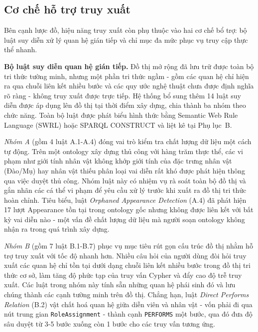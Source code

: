 
\subsection{Cơ chế hỗ trợ truy xuất}
\label{sec:retrieval_optimization}

Bên cạnh lược đồ, hiệu năng truy xuất còn phụ thuộc vào hai cơ chế bổ trợ: bộ luật suy diễn xử lý quan hệ gián tiếp và chỉ mục đa mức phục vụ truy cập thực thể nhanh.

\textbf{Bộ luật suy diễn quan hệ gián tiếp.}
Đồ thị mở rộng đã lưu trữ được toàn bộ tri thức tường minh, nhưng một phần tri thức ngầm - gồm các quan hệ chỉ hiện ra qua chuỗi liên kết nhiều bước và các quy ước nghệ thuật chưa được định nghĩa rõ ràng - không truy xuất được trực tiếp. Hệ thống bổ sung thêm 14 luật suy diễn được áp dụng lên đồ thị tại thời điểm xây dựng, chia thành ba nhóm theo chức năng. Toàn bộ luật được phát biểu hình thức bằng Semantic Web Rule Language (SWRL)  hoặc SPARQL CONSTRUCT và liệt kê tại Phụ lục~B.

\textit{Nhóm A} (gồm 4 luật A.1-A.4) đóng vai trò kiểm tra chất lượng dữ liệu một cách tự động. Trên một ontology xây dựng thủ công với hàng trăm thực thể, các vi phạm như giới tính nhân vật không khớp giới tính của đặc trưng nhân vật (Đào/Mụ) hay nhân vật thiếu phân loại vai diễn rất khó được phát hiện thông qua việc duyệt thủ công. Nhóm luật này có nhiệm vụ rà soát toàn bộ đồ thị và gắn nhãn các cá thể vi phạm để yêu cầu xử lý trước khi xuất ra đồ thị tri thức hoàn chỉnh. Tiêu biểu, luật \textit{Orphaned Appearance Detection} (A.4) đã phát hiện 17 lượt Appearance tồn tại trong ontology gốc nhưng không được liên kết với bất kỳ vai diễn nào - một vấn đề chất lượng dữ liệu mà người soạn ontology không nhận ra trong quá trình xây dựng.

\textit{Nhóm B} (gồm 7 luật B.1-B.7) phục vụ mục tiêu rút gọn cấu trúc đồ thị nhằm hỗ trợ truy xuất với tốc độ nhanh hơn. Nhiều câu hỏi của người dùng đòi hỏi truy xuất các quan hệ chỉ tồn tại dưới dạng chuỗi liên kết nhiều bước trong đồ thị tri thức cơ sở, làm tăng độ phức tạp của truy vấn Cypher và đẩy cao độ trễ truy xuất. Các luật trong nhóm này tính sẵn những quan hệ phái sinh đó và lưu chúng thành các cạnh tường minh trên đồ thị. Chẳng hạn, luật \textit{Direct Performs Relation} (B.2) vật chất hoá quan hệ giữa diễn viên và nhân vật - vốn phải đi qua nút trung gian \texttt{RoleAssignment} - thành cạnh \texttt{PERFORMS} một bước, qua đó đưa độ sâu duyệt từ 3-5 bước xuống còn 1 bước cho các truy vấn tương ứng.

